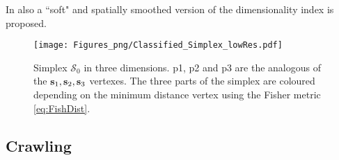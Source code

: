 In \citet{Canducci2021} also a ``soft" and spatially smoothed version of the dimensionality index is proposed.

\begin{figure}[ht!]
  \texttt{[image: Figures\_png/Classified\_Simplex\_lowRes.pdf]}
  \caption{Simplex $\mathcal{S}_0$ in three dimensions. p1, p2 and p3 are the analogous of the $\boldsymbol{\mathbf{s}}_1, \boldsymbol{\mathbf{s}}_2, \boldsymbol{\mathbf{s}}_3$ vertexes. The three parts of the simplex are coloured depending on the minimum distance vertex using the Fisher metric \eqref{eq:FishDist}.}
  \label{fig:simplex}
\end{figure}

\subsection{Crawling} \label{sec:Crawling}


